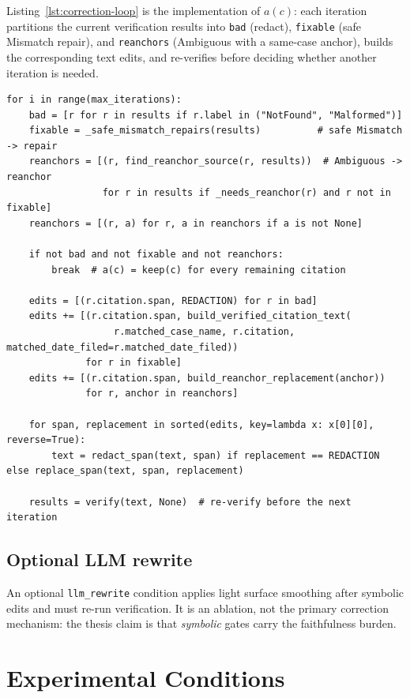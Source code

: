 Listing~\ref{lst:correction-loop} is the implementation of $a(c)$: each iteration partitions the current verification results into \texttt{bad} (redact), \texttt{fixable} (safe Mismatch repair), and \texttt{reanchors} (Ambiguous with a same-case anchor), builds the corresponding text edits, and re-verifies before deciding whether another iteration is needed.

\begin{lstlisting}[caption={Core of the bounded correction loop implementing $a(c)$ (\href{\repourl/blob/main/src/correction_loop/corrector.py}{\texttt{src/correction\_loop/corrector.py}}).}, label={lst:correction-loop}]
for i in range(max_iterations):
    bad = [r for r in results if r.label in ("NotFound", "Malformed")]
    fixable = _safe_mismatch_repairs(results)          # safe Mismatch -> repair
    reanchors = [(r, find_reanchor_source(r, results))  # Ambiguous -> reanchor
                 for r in results if _needs_reanchor(r) and r not in fixable]
    reanchors = [(r, a) for r, a in reanchors if a is not None]

    if not bad and not fixable and not reanchors:
        break  # a(c) = keep(c) for every remaining citation

    edits = [(r.citation.span, REDACTION) for r in bad]
    edits += [(r.citation.span, build_verified_citation_text(
                   r.matched_case_name, r.citation, matched_date_filed=r.matched_date_filed))
              for r in fixable]
    edits += [(r.citation.span, build_reanchor_replacement(anchor))
              for r, anchor in reanchors]

    for span, replacement in sorted(edits, key=lambda x: x[0][0], reverse=True):
        text = redact_span(text, span) if replacement == REDACTION else replace_span(text, span, replacement)

    results = verify(text, None)  # re-verify before the next iteration
\end{lstlisting}

\subsection{Optional LLM rewrite}
An optional \texttt{llm\_rewrite} condition applies light surface smoothing after symbolic edits and must re-run verification. It is an ablation, not the primary correction mechanism: the thesis claim is that \emph{symbolic} gates carry the faithfulness burden.

\section{Experimental Conditions}
\label{sec:conditions}

